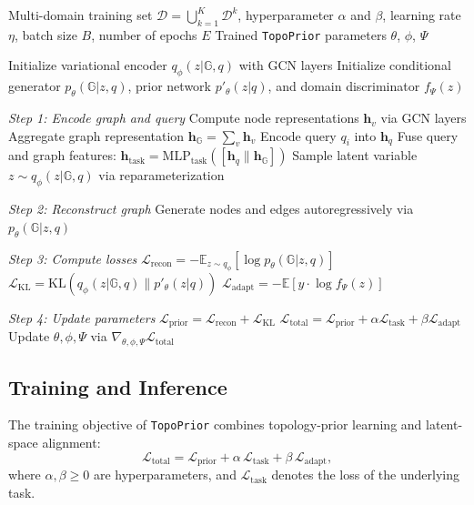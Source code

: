 \documentclass[lettersize,journal]{IEEEtran}
\theoremstyle{plain}
\begin{document}
\begin{algorithm}[!t]
\newcommand{\comm}[1]{\textcolor{gray!80}{\textit{#1}}}
\caption{\texttt{TopoPrior} Training Process}
\label{training_algo}
\footnotesize
\begin{algorithmic}[1]
\REQUIRE Multi-domain training set $\mathcal{D} = \bigcup_{k=1}^{K} \mathcal{D}^{k}$, hyperparameter $\alpha$ and $\beta$, learning rate $\eta$, batch size $B$, number of epochs $E$
\ENSURE Trained \texttt{TopoPrior} parameters $\theta$, $\phi$, $\Psi$

\STATE Initialize variational encoder $q_\phi(z|\mathbb{G}, q)$ with GCN layers
\STATE Initialize conditional generator $p_\theta(\mathbb{G}|z, q)$, prior network $p'_\theta(z|q)$, and domain discriminator $f_\Psi(z)$

        \STATE \comm{Step 1: Encode graph and query}
        \STATE Compute node representations $\mathbf{h}_v$ via GCN layers
        \STATE Aggregate graph representation $\mathbf{h}_{\mathbb{G}} = \sum_{v} \mathbf{h}_v$
        \STATE Encode query $q_i$ into $\mathbf{h}_q$
        \STATE Fuse query and graph features: $\mathbf{h}_{\text{task}} = \mathrm{MLP}_{\text{task}}([\mathbf{h}_q \parallel \mathbf{h}_{\mathbb{G}}])$
        \STATE Sample latent variable $z \sim q_\phi(z|\mathbb{G}, q)$ via reparameterization

        \STATE \comm{Step 2: Reconstruct graph}
        \STATE Generate nodes and edges autoregressively via $p_\theta(\mathbb{G}|z, q)$

        \STATE \comm{Step 3: Compute losses}
        \STATE $\mathcal{L}_{\text{recon}} = -\mathbb{E}_{z \sim q_\phi}[\log p_\theta(\mathbb{G}|z, q)]$
        \STATE $\mathcal{L}_{\text{KL}} = \mathrm{KL}(q_\phi(z|\mathbb{G}, q) \| p'_\theta(z|q))$
        \STATE $\mathcal{L}_{\text{adapt}} = -\mathbb{E}[y \cdot \log f_\Psi(z)]$

        \STATE \comm{Step 4: Update parameters}
        \STATE $\mathcal{L}_{\text{prior}} = \mathcal{L}_{\text{recon}} + \mathcal{L}_{\text{KL}}$
        \STATE $\mathcal{L}_{\text{total}} = \mathcal{L}_{\text{prior}} + \alpha \mathcal{L}_{\mathrm{task}} + \beta \mathcal{L}_{\text{adapt}}$
        \STATE Update $\theta, \phi, \Psi$ via $\nabla_{\theta, \phi, \Psi} \mathcal{L}_{\text{total}}$
    \ENDFOR
\ENDFOR
\end{algorithmic}
\end{algorithm}

\subsection{Training and Inference}
The training objective of \texttt{TopoPrior} combines topology-prior learning and latent-space alignment:
\begin{equation}
\mathcal{L}_{\mathrm{total}}
=
\mathcal{L}_{\mathrm{prior}}
+
\alpha\,\mathcal{L}_{\mathrm{task}}
+
\beta\,\mathcal{L}_{\mathrm{adapt}},
\end{equation}
where $\alpha,\beta\geq 0$ are hyperparameters, and $\mathcal{L}_{\mathrm{task}}$ denotes the loss of the underlying task.
\end{document}
